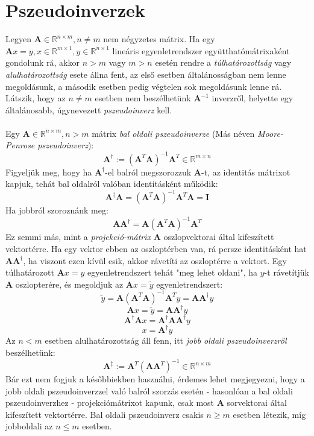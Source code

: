 \documentclass[14p]{report}
\def\pmb{\boldsymbol}
\newcounter{x}
\newcounter{y}
\newcounter{z}
\begin{document}
	\section{Pszeudoinverzek}
	Legyen $\pmb{A} \in \mathbb{R}^{n\times m}, n \ne m$ nem négyzetes mátrix. Ha egy  $\pmb{A}x = y , x \in \mathbb{R}^{m\times 1}, y \in \mathbb{R}^{n \times 1}$ lineáris egyenletrendszer együtthatómátrixaként gondolunk rá, akkor $n > m$ vagy $m > n$ esetén rendre a \emph{túlhatározottság} vagy \emph{alulhatározottság} esete állna fent, az első esetben általánosságban nem lenne megoldásunk, a második esetben pedig végtelen sok megoldásunk lenne rá. Látszik, hogy az $n \ne m$ esetben nem beszélhetünk $\pmb{A}^{-1}$ inverzről, helyette egy általánosabb, úgynevezett \emph{pszeudoinverz} kell.
	\\
	\\
	Egy $\pmb{A} \in \mathbb{R}^{n \times m}, n > m$ mátrix \emph{bal oldali pszeudoinverze} (Más néven \emph{Moore-Penrose pszeudoinverz}):
	\[
	\pmb{A}^{\dagger} := (\pmb{A}^T\pmb{A})^{-1}\pmb{A}^T \in \mathbb{R}^{m \times n}
	\]
	Figyeljük meg, hogy ha $\pmb{A}^{\dagger}$-el balról megszorozzuk $\pmb{A}$-t, az identitás mátrixot kapjuk, tehát bal oldalról valóban identitásként működik:
	\[
	\pmb{A}^{\dagger}\pmb{A} = (\pmb{A}^T\pmb{A})^{-1}\pmb{A}^T\pmb{A} = \pmb{I}
	\]
	Ha jobbról szoroznánk meg:
	\[
	\pmb{A}\pmb{A}^{\dagger} = \pmb{A}(\pmb{A}^T\pmb{A})^{-1}\pmb{A}^T
	\]
	Ez semmi más, mint a \emph{projekció-mátrix} $\pmb{A}$ oszlopvektorai által kifeszített vektortérre. Ha egy vektor ebben az oszloptérben van, rá persze identitásként hat $\pmb{A}\pmb{A}^{\dagger}$, ha viszont ezen kívül esik, akkor rávetíti az oszloptérre a vektort. Egy túlhatározott $\pmb{A}x = y$ egyenletrendszert tehát "meg lehet oldani", ha $y$-t rávetítjük $\pmb{A}$ oszlopterére, és megoldjuk az $\pmb{A}x = \tilde{y}$ egyenletrendszert: 
	\[
	\tilde{y} = \pmb{A}(\pmb{A}^T\pmb{A})^{-1}\pmb{A}^T y = \pmb{A}\pmb{A}^{\dagger} y
	\]
	\[
	\pmb{A}x = \tilde{y} = \pmb{A}\pmb{A}^{\dagger}y
	\]
	\[
	\pmb{A}^{\dagger}\pmb{A}x = \pmb{A}^{\dagger}\pmb{A}\pmb{A}^{\dagger}y
	\]
	\[
	x  = \pmb{A}^{\dagger}y
	\]
	Az $n < m$ esetben alulhatározottság áll fenn, itt \emph{jobb oldali pszeudoinverzről} beszélhetünk:
	\[
	\pmb{A}^{\ddagger} := \pmb{A}^T(\pmb{A}\pmb{A}^T)^{-1} \in \mathbb{R}^{n \times m}
	\]
	Bár ezt nem fogjuk a későbbiekben használni, érdemes lehet megjegyezni, hogy a jobb oldali pszeudoinverzzel való balról szorzás esetén - hasonlóan a bal oldali pszeudoinverzhez - projekciómátrixot kapunk, csak most $\pmb{A}$ sorvektorai által kifeszített vektortérre. Bal oldali pszeudoinverz csakis $n \ge m$ esetben létezik, míg jobboldali az $n \le m$ esetben.
	
\end{document}
